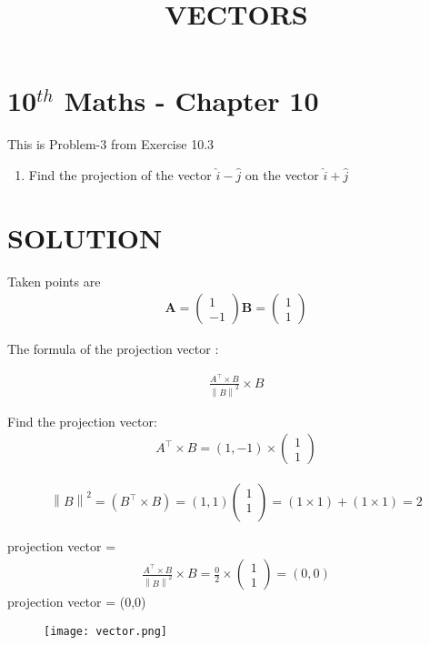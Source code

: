 \documentclass[12pt]{article}
\providecommand{\norm}[1]{\left\lVert#1\right\rVert}
\newcommand{\myvec}[1]{\ensuremath{\begin{pmatrix}#1\end{pmatrix}}}
\let\vec\mathbf
\begin{document}
\begin{center}
\title{\textbf{VECTORS}}
\date{\vspace{-5ex}} %
\maketitle
\end{center}

\setcounter{page}{1}

\section{10$^{th}$ Maths - Chapter 10}

This is Problem-3 from Exercise 10.3

\begin{enumerate}
\item Find the projection of the vector $\hat{i}-\hat{j}$ on the vector $\hat{i}+\hat{j}$  
\end{enumerate}
\section{SOLUTION}
Taken points are
\begin{align}
 \vec{A}=\myvec{1\\ -1}
 \vec{B}=\myvec{1\\ 1}
\end{align}

The formula of the projection vector :
 
\begin{align}
\frac{A^\top \times B}{\norm B^2}\times B
\end{align}

Find the projection vector:
\begin{align}
A^\top \times B = (1, -1)\times \myvec{1\\ 1}
\end{align}

\begin{align}
\norm B^2 = (B^\top \times B)=(1,1)\left(\begin{matrix}
1\\
1\\
\end{matrix}\right)= (1\times1)+(1\times1)=2
\end{align}

projection vector = 
\begin{align}
 \frac{A^\top \times B}{\norm B^2}\times B
   =\frac{0}{2}\times \myvec{1\\ 1}
    =(0,0)
\end{align}
projection vector = (0,0)

\begin{figure}[h]
  \centering
  \texttt{[image: vector.png]}
\caption{}
\end{figure}
\end{document}
